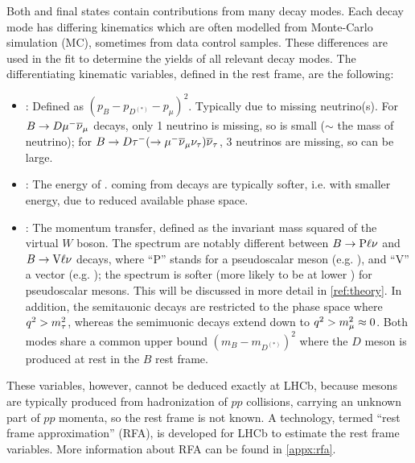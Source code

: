 Both \Dstarp\mun and \Dz\mun final states contain contributions from many decay
modes.
Each decay mode has differing kinematics
which are often modelled from Monte-Carlo simulation (MC),
sometimes from data control samples.
These differences are used in the fit to determine the yields of all
relevant decay modes.
The differentiating kinematic variables, defined in the \B rest frame,
are the following:
\begin{itemize}
    \item \mmSq: Defined as $(p_B - p_{D^{(*)}} - p_\mu)^2$.
        Typically due to missing neutrino(s).
        For $B \rightarrow D {\mu^-} {{\overline{\nu}}_\mu}$ decays, only 1 neutrino is missing,
        so \mmSq is small ($\sim$ the mass of neutrino);
        for $B \rightarrow D {\tau^-} (\rightarrow {\ensuremath{\mu^-}}{\ensuremath{{\overline{\nu}}_\mu}}{\ensuremath{{\nu}_\tau}}) {{\overline{\nu}}_\tau}$,
        3 neutrinos are missing, so \mmSq can be large.
    \item \el: The energy of \mun. \mun coming from \taum decays are typically
        softer, i.e. with smaller energy, due to reduced available phase space.
    \item \qSq: The momentum transfer, defined as the invariant mass squared
        of the virtual $W$ boson.
        The \qSq spectrum are notably different between
        $B \rightarrow \text{P} \ell{\ensuremath{\nu}}$ and $B \rightarrow \text{V} \ell{\ensuremath{\nu}}$
        decays, where ``P'' stands for a pseudoscalar meson (e.g. \Dz),
        and ``V'' a vector (e.g. \Dstar);
        the \qSq spectrum is softer
        (more likely to be at lower \qSq) for pseudoscalar mesons.
        This will be discussed in more detail in \cref{ref:theory}.
        In addition, the semitauonic decays are restricted to the phase space
        where $q^2 > m^2_\tau$,
        whereas the semimuonic decays extend down to $q^2 > m^2_\mu \approx 0$.
        Both modes share a common \qSq upper bound $(m_B - m_{D^{(*)}})^2$
        where the $D$ meson is produced at rest in the $B$ rest frame.
\end{itemize}
These variables, however, cannot be deduced exactly at LHCb,
because \B mesons
are typically produced from hadronization of $pp$ collisions,
carrying an unknown part of $pp$ momenta,
so the \B rest frame is not known.
A technology, termed ``rest frame approximation'' (RFA), is developed for LHCb
to estimate the rest frame variables.
More information about RFA can be found in \cref{appx:rfa}.


